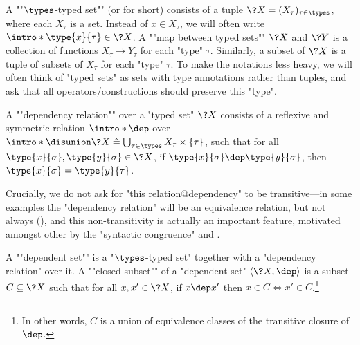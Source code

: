 A \AP""$\types$-typed set"" (or  for short) consists of
a tuple $\?X = (X_\tau)_{\tau \in \types}$, where each $X_\tau$ is a set.
Instead of $x \in X_\tau$, we will often write \AP$\intro*\type{x}{\tau} \in \?X$.
A \AP""map between typed sets"" $\?X$ and $\?Y$ is a collection of functions
$X_\tau \to Y_\tau$ for each "type" $\tau$.
Similarly, a subset of $\?X$ is a tuple of subsets of $X_\tau$ for each "type" $\tau$.
To make the notations less heavy, we will often think of
"typed sets" as sets with type annotations rather than tuples, and ask that
all operators/constructions should preserve this "type".

\begin{definition}
	\AP\label{def:dependency}
	A \AP""dependency relation"" over a "typed set" $\?X$ consists of
	a reflexive and symmetric relation $\intro*\dep$ over
	\AP$\intro*\disunion \?X \defeq \bigcup_{\tau \in \types} X_\tau \times \{\tau\}$,
	such that for all $\type{x}{\sigma}, \type{y}{\sigma} \in \?X$,
	if $\type{x}{\sigma} \dep \type{y}{\sigma}$,
	then $\type{x}{\sigma} = \type{y}{\tau}$.

	Crucially, we do not ask for "this relation@dependency" to be transitive---in some examples the "dependency relation" will be an equivalence relation, but not always (), and
	this non-transitivity is actually an important feature, motivated amongst other by the
	"syntactic congruence" and .

	A \AP""dependent set"" is a "$\types$-typed set" together with a
	"dependency relation" over it. A \AP""closed subset"" of a "dependent set" $\langle \?X, \dep \rangle$ is a subset $C \subseteq \?X$ such that for all
	$x, x' \in \?X$, if $x \dep x'$ then $x \in C \iff x' \in C$.\footnote{In other
	words, $C$ is a union of equivalence classes of the transitive closure of $\dep$.}
\end{definition}
